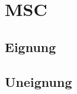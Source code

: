 \section{MSC}
\label{sc:MSCB}

\subsection{Eignung}
\label{sc:MSCEignung}

\subsection{Uneignung}
\label{sc:MSCUnEignung}